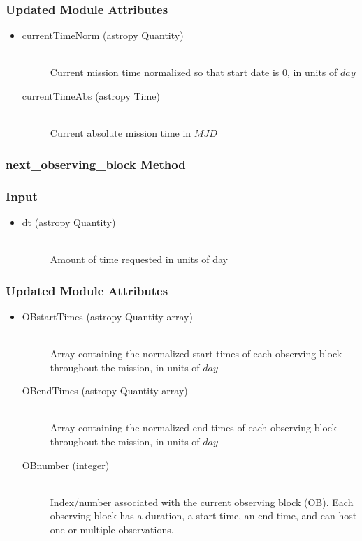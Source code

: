 \documentclass[cleanfoot]{asme2ej}
\begin{document}
\subsubsection*{Updated Module Attributes}
\begin{itemize}
\item 
\begin{description}
    \item[currentTimeNorm (astropy Quantity)] \hfill \\ Current mission time normalized so that start date is 0, in units of $ day $
    \item[currentTimeAbs (astropy \href{http://astropy.readthedocs.org/en/latest/time/index.html}{Time})] \hfill \\ Current absolute mission time in $ MJD $
\end{description}
\end{itemize}

\subsubsection{next\_observing\_block Method} \label{sec:nextOBtask}

\subsubsection*{Input}
\begin{itemize}
\item 
\begin{description}
    \item[dt (astropy Quantity)] \hfill \\ Amount of time requested in units of day
\end{description}
\end{itemize}

\subsubsection*{Updated Module Attributes}
\begin{itemize}
\item 
\begin{description}
    \item[OBstartTimes (astropy Quantity array)] \hfill \\ Array containing the normalized start times of each observing block throughout the mission, in units of $day$
    \item[OBendTimes (astropy Quantity array)] \hfill \\ Array containing the normalized end times of each observing block throughout the mission, in units of $day$
    \item[OBnumber (integer)] \hfill \\ Index/number associated with the current observing block (OB). Each observing block has a duration, a start time, an end time, and can host one or multiple observations.
\end{description}
\end{itemize}
\end{document}
